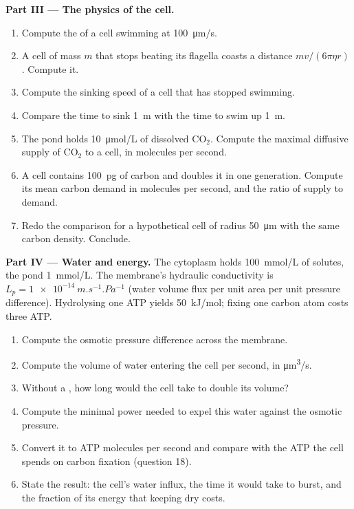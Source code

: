 \begin{problem}
\medskip
\noindent\textbf{Part III --- The physics of the cell.}
\begin{enumerate}[resume]
  \item Compute the  of a cell swimming at
        \qty{100}{\micro m/s}.
  \item A cell of mass $m$ that stops beating its flagella coasts a
        distance $mv/(6\pi\eta r)$. Compute it.
  \item Compute the sinking speed of a cell that has stopped
        swimming.
  \item Compare the time to sink \qty{1}{m} with the time to swim up
        \qty{1}{m}.
  \item The pond holds \qty{10}{\micro mol/L} of dissolved
        $\mathrm{CO_2}$. Compute the maximal diffusive supply of
        $\mathrm{CO_2}$ to a cell, in molecules per second.
  \item A cell contains \qty{100}{pg} of carbon and doubles it in
        one generation. Compute its mean carbon demand in molecules
        per second, and the ratio of supply to demand.
  \item Redo the comparison for a hypothetical cell of radius
        \qty{50}{\micro m} with the same carbon density. Conclude.
\end{enumerate}

\medskip
\noindent\textbf{Part IV --- Water and energy.}
The cytoplasm holds \qty{100}{mmol/L} of solutes, the pond
\qty{1}{mmol/L}. The membrane's hydraulic conductivity is $L_p =
\qty{1e-14}{m.s^{-1}.Pa^{-1}}$ (water volume flux per unit area per
unit pressure difference). Hydrolysing one ATP yields
\qty{50}{kJ/mol}; fixing one carbon atom costs three ATP.
\begin{enumerate}[resume]
  \item Compute the osmotic pressure difference across the membrane.
  \item Compute the volume of water entering the cell per second, in
        \unit{\micro m^3/s}.
  \item Without a , how long would the cell take
        to double its volume?
  \item Compute the minimal power needed to expel this water against
        the osmotic pressure.
  \item Convert it to ATP molecules per second and compare with the
        ATP the cell spends on carbon fixation (question 18).
  \item State the result: the cell's water influx, the time it would
        take to burst, and the fraction of its energy that keeping dry
        costs.
\end{enumerate}
\end{problem}
